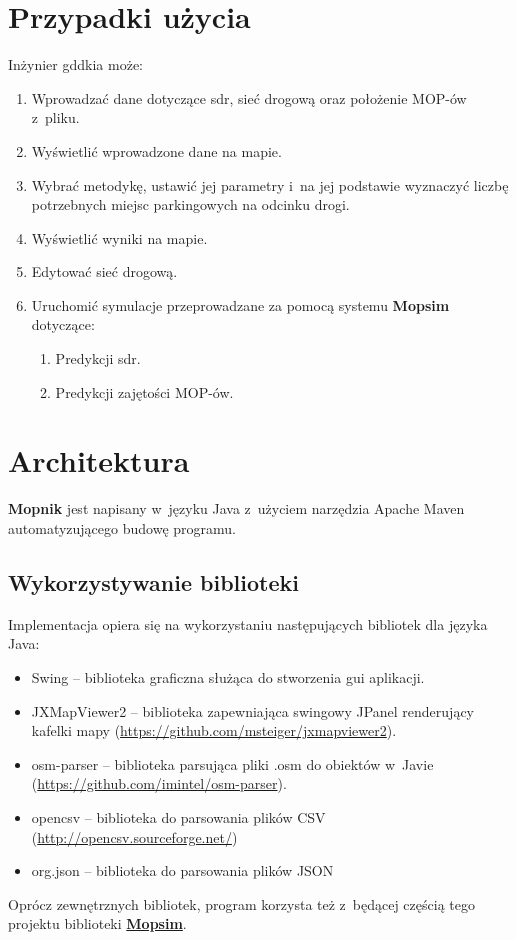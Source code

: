 \section{Przypadki użycia}
Inżynier \acrshort{gddkia} może:
\begin{enumerate}
  \item Wprowadzać dane dotyczące \acrshort{sdr}, sieć drogową oraz położenie MOP-ów z~pliku.
  \item Wyświetlić wprowadzone dane na mapie.
  \item Wybrać metodykę, ustawić jej parametry i~na jej podstawie wyznaczyć
    liczbę potrzebnych miejsc parkingowych na odcinku drogi.
  \item Wyświetlić wyniki na mapie.
  \item Edytować sieć drogową. 
  \item Uruchomić symulacje przeprowadzane za pomocą systemu
    \textbf{Mopsim} dotyczące:
    \begin{enumerate}
      \item Predykcji \acrshort{sdr}.
      \item Predykcji zajętości MOP-ów.
    \end{enumerate}
\end{enumerate}

\section{Architektura}
\textbf{Mopnik} jest napisany w~języku Java z~użyciem narzędzia Apache
Maven automatyzującego budowę programu.
\subsection{Wykorzystywanie biblioteki}
Implementacja opiera się na wykorzystaniu następujących bibliotek dla języka
Java:
\begin{itemize}
\item Swing -- biblioteka graficzna służąca do stworzenia \acrshort{gui} aplikacji.
\item JXMapViewer2 -- biblioteka zapewniająca swingowy JPanel renderujący
  kafelki mapy (\url{https://github.com/msteiger/jxmapviewer2}).
\item osm-parser -- biblioteka parsująca pliki .osm do obiektów w~Javie
  (\url{https://github.com/imintel/osm-parser}).
\item opencsv -- biblioteka do parsowania plików CSV
  (\url{http://opencsv.sourceforge.net/})
\item org.json -- biblioteka do parsowania plików JSON 
\end{itemize}
Oprócz zewnętrznych bibliotek, program korzysta też z~będącej częścią tego
projektu biblioteki \hyperref[r:mopsim]{\textbf{Mopsim}}. 
